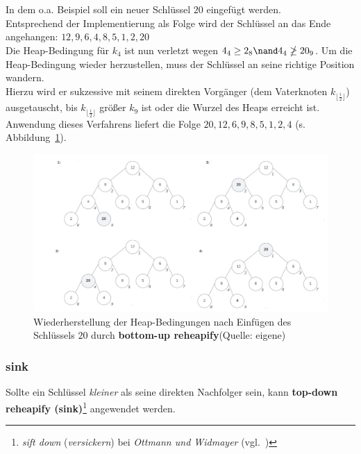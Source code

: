 \noindent
In dem o.a. Beispiel soll ein neuer Schlüssel $20$ eingefügt werden.\\
Entsprechend der Implementierung als Folge wird der Schlüssel an das Ende angehangen: $12, 9, 6, 4, 8, 5, 1, 2, 20$\\

\noindent
Die Heap-Bedingung für $k_4$ ist nun verletzt wegen $4_4 \geq 2_8 \nand 4_4 \ngeq 20_9$.
Um die Heap-Bedingung wieder herzustellen, muss der Schlüssel an seine richtige Position wandern.\\
Hierzu wird er sukzessive mit seinem direkten Vorgänger (dem Vaterknoten $k_{\lfloor \frac{i}{2} \rfloor}$) ausgetauscht, bis $k_{\lfloor \frac{i}{2} \rfloor}$ größer $k_9$ ist oder die Wurzel des Heaps erreicht ist.\\
Anwendung dieses Verfahrens liefert die Folge $20, 12, 6, 9, 8, 5, 1, 2, 4$  (s. Abbildung~\ref{fig:swim}).

\begin{figure}
    \begin{center}
        \includegraphics[scale=0.25]{chapters/Datenstrukturen und Algorithmen/img/swim}
        \caption{Wiederherstellung der Heap-Bedingungen nach Einfügen des Schlüssels $20$ durch \textbf{bottom-up reheapify}(Quelle: eigene)}
        \label{fig:swim}
    \end{center}
\end{figure}

\subsubsection{sink}
Sollte ein Schlüssel \textit{kleiner} als seine direkten Nachfolger sein, kann \textbf{top-down reheapify (sink)}\footnote{\textit{sift down} (\textit{versickern}) bei \textit{Ottmann und Widmayer} (vgl.~\cite[107 f.]{OW17b})} angewendet werden.\\

